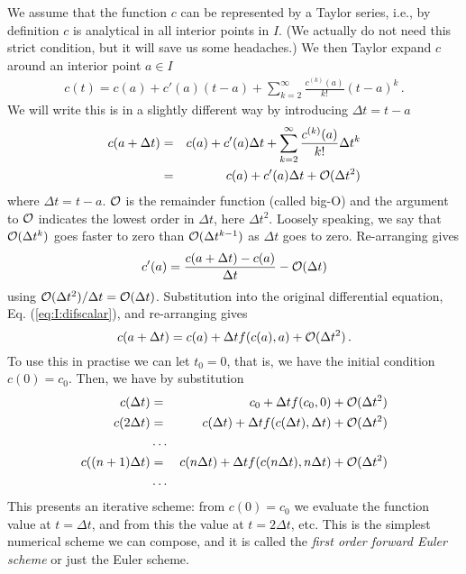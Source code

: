 We assume that the function $c$ can be represented by a  
Taylor series, i.e., by definition $c$ is analytical in all interior points in $I$. (We actually do not need this strict condition, but it will 
save us some headaches.) We then Taylor expand $c$ around an interior point $a \in I$
\begin{eqnarray}
	c(t) = c(a) + c'(a)(t-a) + \sum_{k=2}^\infty   \frac{c^{(k)}(a)}{k!}(t-a)^k \, . 
\end{eqnarray}
We will write this is in a slightly different way by introducing $\Delta t = t -a$
\begin{eqnarray}
  c(a + \Delta t) &=& c(a)+c'(a)\Delta t + \sum_{k=2}^\infty
  \frac{c^{(k)}(a)}{k!}\Delta t^k \nonumber \\ &=&
  c(a)+c'(a)\Delta t + \mathcal{O}(\Delta t^2)
\end{eqnarray}
where $\Delta t = t-a$. $\mathcal{O}$ is the remainder function (called
big-O) and the argument to $\mathcal{O}$ indicates the lowest order in
$\Delta t$, here $\Delta t^2$. Loosely speaking, we say that
$\mathcal{O}(\Delta t^{k})$ goes faster to zero than $\mathcal{O}(\Delta t^{k-1})$
as $\Delta t$ goes to zero. Re-arranging gives
\begin{equation}
  \label{eq:o1}
  c'(a) = \frac{c(a+\Delta t)-c(a)}{\Delta t} - \mathcal{O}(\Delta t)
\end{equation}
using $\mathcal{O}(\Delta t^2)/\Delta t = \mathcal{O}(\Delta t)$. 
Substitution into the original differential equation, Eq. (\ref{eq:I:difscalar}), and re-arranging 
gives  
\begin{equation}
  c(a+\Delta t) = c(a) + \Delta t f(c(a), a) + \mathcal{O}(\Delta t^2) \, .
\end{equation}
To use this in practise we can let $t_0=0$, that is, we have the
initial condition $c(0)=c_0$. Then, we have by substitution
\begin{eqnarray}
  c(\Delta t) &=& c_0 + \Delta t f(c_0, 0) +
  \mathcal{O}(\Delta t^2) \nonumber \\
  c(2\Delta t) &=& c(\Delta t) + \Delta t
	f(c(\Delta t), \Delta t) + \mathcal{O}(\Delta t^2) \nonumber \\
  &\ldots& \nonumber \\
  c((n+1)\Delta t) &  =& c(n\Delta t) +
  \Delta t f(c(n\Delta t), n\Delta t) + \mathcal{O}(\Delta t^2)
  \label{eq:I:iteration} \\
  &\ldots& \nonumber
\end{eqnarray}
This presents an iterative scheme: from $c(0)=c_0$ we evaluate the
function value at $t=\Delta t$, and from this the value at $t=2\Delta
t$, etc. This is the simplest numerical scheme we can compose, and it is called the
\emph{first order forward Euler scheme} or just the Euler scheme.

